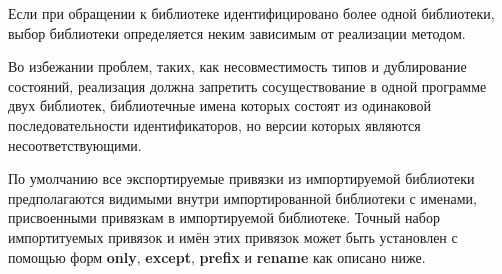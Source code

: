 Если при обращении к библиотеке идентифицировано более одной библиотеки, выбор библиотеки
определяется неким зависимым от реализации методом.\vspace{1mm}

Во избежании проблем, таких, как несовместимость типов и дублирование состояний, реализация
должна запретить сосуществование в одной программе двух библиотек, библиотечные имена которых
состоят из одинаковой последовательности идентификаторов, но версии которых являются
несоответствующими.\vspace{1mm}

По умолчанию все экспортируемые привязки из импортируемой библиотеки предполагаются видимыми
внутри импортированной библиотеки с именами, присвоенными привязкам в импортируемой
библиотеке. Точный набор импортитуемых привязок и имён этих привязок может быть установлен с
помощью форм {\cf\bfseries only}, {\cf\bfseries except}, {\cf\bfseries prefix} и {\cf\bfseries
rename} как описано ниже.\vspace{1mm}

